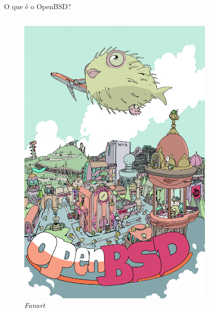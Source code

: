 \documentclass[9pt,xcolor=table]{beamer}
\begin{document}
\begin{frame}{O que é o OpenBSD?}
    \begin{columns}
        \begin{column}{0.3\textwidth}
            \begin{figure}
            \centering
            \includegraphics[width=\textwidth]{imagens/openbsd-fan.jpg}
            \caption{\textit{Fanart}}
            \end{figure}
        \end{column}
        \begin{column}{0.3\textwidth}
            \begin{figure}
            \centering

\end{figure}
\end{column}
\end{columns}
\end{frame}
\end{document}

